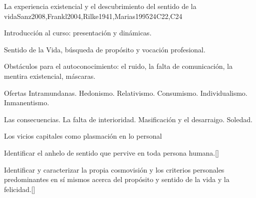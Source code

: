 \begin{syllabus}
\begin{outcomes}
    \item {}
    \item {}
\end{outcomes}
\begin{competences}
    \item {}
    \item {}
\end{competences}

\begin{unit}{}{La experiencia existencial y el descubrimiento del sentido de la vida}{Sanz2008,Frankl2004,Rilke1941,Marias1995}{24}{C22,C24}
\begin{topics}
	\item Introducción al curso: presentación y dinámicas.
	\item Sentido de la Vida, búsqueda de propósito y vocación profesional.
	\item Obstáculos para el autoconocimiento: el ruido, la falta de comunicación, la mentira existencial, máscaras.
	\item Ofertas Intramundanas.
		\subitem Hedonismo.
		\subitem Relativismo.
		\subitem Consumismo.
		\subitem Individualismo.
		\subitem Inmanentismo.
	\item Las consecuencias.
		\subitem La falta de interioridad.
		\subitem Masificación y el desarraigo.
		\subitem Soledad. 
	\item Los vicios capitales como plasmación en lo personal
\end{topics}
\begin{learningoutcomes}
	\item Identificar el anhelo de sentido que pervive en toda persona humana.[\Familiarity]
	\item Identificar y caracterizar la propia cosmovisión y los criterios personales predominantes en sí mismos acerca del propósito y sentido de la vida y la felicidad.[\Familiarity]
\end{learningoutcomes}
\end{unit}


\end{syllabus}

